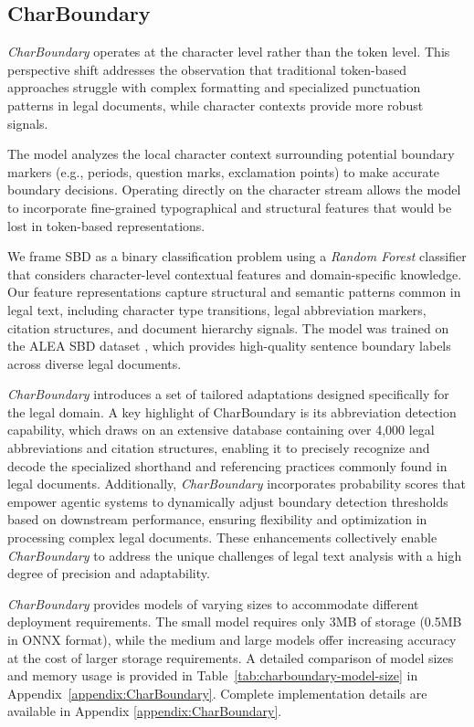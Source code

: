 \subsection{CharBoundary}
\textit{CharBoundary} operates at the character level rather than the token level. This perspective shift addresses the observation that traditional token-based approaches struggle with complex formatting and specialized punctuation patterns in legal documents, while character contexts provide more robust signals.

The model analyzes the local character context surrounding potential boundary markers (e.g., periods, question marks, exclamation points) to make accurate boundary decisions. Operating directly on the character stream allows the model to incorporate fine-grained typographical and structural features that would be lost in token-based representations.

We frame SBD as a binary classification problem using a \textit{Random Forest} classifier \cite{breiman2001random} that considers character-level contextual features and domain-specific knowledge. Our feature representations capture structural and semantic patterns common in legal text, including character type transitions, legal abbreviation markers, citation structures, and document hierarchy signals.  The model was trained on the ALEA SBD dataset \cite{alea-benchmark}, which provides high-quality sentence boundary labels across diverse legal documents.

\textit{CharBoundary} introduces a set of tailored adaptations designed specifically for the legal domain.  A key highlight of CharBoundary is its abbreviation detection capability, which draws on an extensive database containing over 4,000 legal abbreviations and citation structures, enabling it to precisely recognize and decode the specialized shorthand and referencing practices commonly found in legal documents.  Additionally, \textit{CharBoundary} incorporates probability scores that empower agentic systems to dynamically adjust boundary detection thresholds based on downstream performance, ensuring flexibility and optimization in processing complex legal documents.  These enhancements collectively enable \textit{CharBoundary} to address the unique challenges of legal text analysis with a high degree of precision and adaptability.

\textit{CharBoundary} provides models of varying sizes to accommodate different deployment requirements. The small model requires only 3MB of storage (0.5MB in ONNX format), while the medium and large models offer increasing accuracy at the cost of larger storage requirements. A detailed comparison of model sizes and memory usage is provided in Table~\ref{tab:charboundary-model-size} in Appendix~\ref{appendix:CharBoundary}.  Complete implementation details are available in Appendix \ref{appendix:CharBoundary}.

